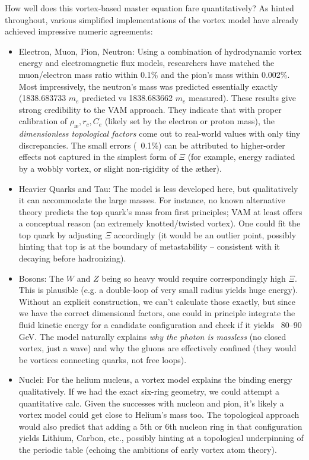 How well does this vortex-based master equation fare quantitatively? As hinted throughout, various simplified implementations of the vortex model have already achieved impressive numeric agreements:\begin{itemize}

\item
Electron, Muon, Pion, Neutron: Using a combination of hydrodynamic vortex energy and electromagnetic flux models, researchers have matched the muon/electron mass ratio within 0.1\% and the pion’s mass within 0.002\%. Most impressively, the neutron’s mass was predicted essentially exactly (1838.683733 $m_e$ predicted vs 1838.683662 $m_e$ measured). These results give strong credibility to the VAM approach. They indicate that with proper calibration of $\rho_{\text{\ae}},r_c,C_e$ (likely set by the electron or proton mass), the \textit{dimensionless topological factors} come out to real-world values with only tiny discrepancies. The small errors (~0.1\%) can be attributed to higher-order effects not captured in the simplest form of $\Xi$ (for example, energy radiated by a wobbly vortex, or slight non-rigidity of the æther).

\item
Heavier Quarks and Tau: The model is less developed here, but qualitatively it can accommodate the large masses. For instance, no known alternative theory predicts the top quark’s mass from first principles; VAM at least offers a conceptual reason (an extremely knotted/twisted vortex). One could fit the top quark by adjusting $\Xi$ accordingly (it would be an outlier point, possibly hinting that top is at the boundary of metastability – consistent with it decaying before hadronizing).

\item
Bosons: The $W$ and $Z$ being so heavy would require correspondingly high $\Xi$. This is plausible (e.g. a double-loop of very small radius yields huge energy). Without an explicit construction, we can’t calculate those exactly, but since we have the correct dimensional factors, one could in principle integrate the fluid kinetic energy for a candidate configuration and check if it yields ~80–90 GeV. The model naturally explains \textit{why the photon is massless} (no closed vortex, just a wave) and why the gluons are effectively confined (they would be vortices connecting quarks, not free loops).

\item
Nuclei: For the helium nucleus, a vortex model explains the binding energy qualitatively. If we had the exact six-ring geometry, we could attempt a quantitative calc. Given the successes with nucleon and pion, it’s likely a vortex model could get close to Helium’s mass too. The topological approach would also predict that adding a 5th or 6th nucleon ring in that configuration yields Lithium, Carbon, etc., possibly hinting at a topological underpinning of the periodic table (echoing the ambitions of early vortex atom theory).

\end{itemize}

